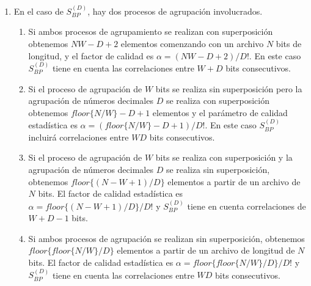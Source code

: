 \begin{enumerate}
	\item En el caso de $S^{(D)}_{BP} $, hay dos procesos de agrupación involucrados.
	\begin{enumerate}
		\item Si ambos procesos de agrupamiento se realizan con superposición obtenemos $NW-D + 2$ elementos comenzando con un archivo $ N $ bits de longitud, y el factor de calidad es $\alpha = (NW-D + 2) / D!$.
		En este caso $S ^ {(D)}_{BP}$ tiene en cuenta las correlaciones entre $W + D$ bits consecutivos.
		\item Si el proceso de agrupación de $W$ bits se realiza sin superposición pero la agrupación de números decimales $D$ se realiza con superposición obtenemos $floor\{N/W\}-D+1$ elementos y el parámetro de calidad estadística es $\alpha=(floor\{N/W\}-D+1)/D!$.
		En este caso $S^{(D)}_{BP}$ incluirá correlaciones entre $WD$ bits consecutivos.
		\item Si el proceso de agrupación de $W$ bits se realiza con superposición y la agrupación de números decimales $D$ se realiza sin superposición, obtenemos $floor\{(N-W+1)/D\}$ elementos a partir de un archivo de $N$ bits.
		El factor de calidad estadística es $\alpha=floor\{(N-W+1)/D\}/D!$ y $S^{(D)}_{BP}$ tiene en cuenta correlaciones de $W+D-1$ bits.
		\item Si ambos procesos de agrupación se realizan sin superposición, obtenemos $floor\{floor\{N/W\}/D\}$ elementos a partir de un archivo de longitud de  $N$ bits.
		El factor de calidad estadística es $\alpha=floor\{floor\{N/W\}/D\}/D!$ y $S^{(D)}_{BP}$ tiene en cuenta las correlaciones entre $WD$ bits consecutivos.
	\end{enumerate}
\end{enumerate} 